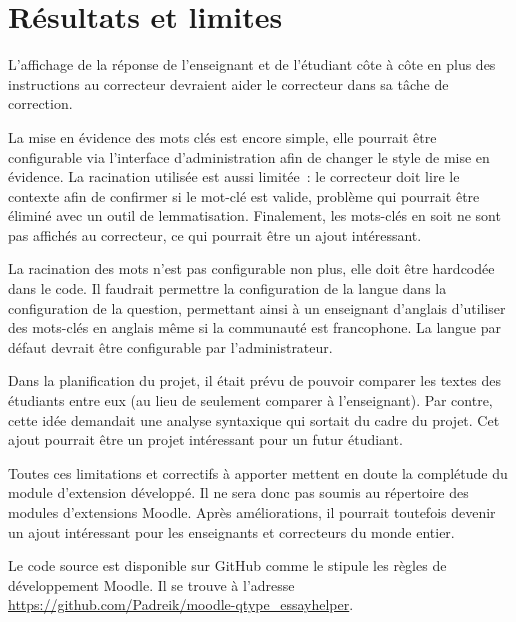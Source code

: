 \chapter{R\'esultats et limites}


L'affichage de la réponse de l'enseignant et de l'étudiant côte à côte en plus des instructions au correcteur devraient aider le correcteur dans sa tâche de correction.

La mise en évidence des mots clés est encore simple, elle pourrait être configurable via l'interface d'administration afin de changer le style de mise en évidence.
La racination utilisée est aussi limitée~: le correcteur doit lire le contexte afin de confirmer si le mot-clé est valide, problème qui pourrait être éliminé avec un outil de lemmatisation.
Finalement, les mots-clés en soit ne sont pas affichés au correcteur, ce qui pourrait être un ajout intéressant.

La racination des mots n'est pas configurable non plus, elle doit être \og hardcodée \fg{} dans le code.
Il faudrait permettre la configuration de la langue dans la configuration de la question, permettant ainsi à un enseignant d'anglais d'utiliser des mots-clés en anglais même si la communauté est francophone.
La langue par défaut devrait être configurable par l'administrateur.

Dans la planification du projet, il était prévu de pouvoir comparer les textes des étudiants entre eux (au lieu de seulement comparer à l'enseignant).
Par contre, cette idée demandait une analyse syntaxique qui sortait du cadre du projet.
Cet ajout pourrait être un projet intéressant pour un futur étudiant.

Toutes ces limitations et correctifs à apporter mettent en doute la complétude du module d'extension développé.
Il ne sera donc pas soumis au répertoire des modules d'extensions Moodle.
Après améliorations, il pourrait toutefois devenir un ajout intéressant pour les enseignants et correcteurs du monde entier.

Le code source est disponible sur GitHub comme le stipule les règles de développement Moodle.
Il se trouve à l'adresse \url{https://github.com/Padreik/moodle-qtype_essayhelper}.